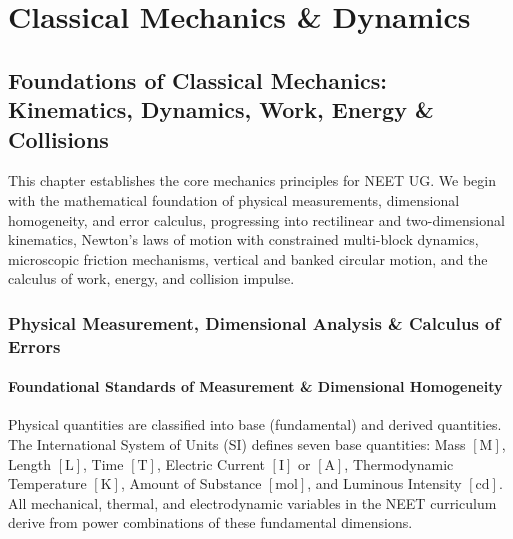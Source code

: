 \documentclass[10pt,twoside,openright]{book}
\begin{document}
\cleardoublepage

\setcounter{tocdepth}{2}
\setcounter{secnumdepth}{2}
\tableofcontents
\cleardoublepage

\mainmatter

\part{Classical Mechanics \& Dynamics}

\chapter{Foundations of Classical Mechanics: Kinematics, Dynamics, Work, Energy \& Collisions}

This chapter establishes the core mechanics principles for NEET UG. We begin with the mathematical foundation of physical measurements, dimensional homogeneity, and error calculus, progressing into rectilinear and two-dimensional kinematics, Newton's laws of motion with constrained multi-block dynamics, microscopic friction mechanisms, vertical and banked circular motion, and the calculus of work, energy, and collision impulse.

\section{Physical Measurement, Dimensional Analysis \& Calculus of Errors}

\subsection{Foundational Standards of Measurement \& Dimensional Homogeneity}
Physical quantities are classified into base (fundamental) and derived quantities. The International System of Units (SI) defines seven base quantities: Mass $[\mathrm{M}]$, Length $[\mathrm{L}]$, Time $[\mathrm{T}]$, Electric Current $[\mathrm{I}]$ or $[\mathrm{A}]$, Thermodynamic Temperature $[\mathrm{K}]$, Amount of Substance $[\mathrm{mol}]$, and Luminous Intensity $[\mathrm{cd}]$. All mechanical, thermal, and electrodynamic variables in the NEET curriculum derive from power combinations of these fundamental dimensions.
\end{document}
